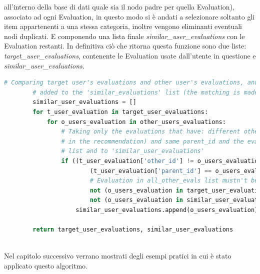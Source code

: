 \begin{itemize}
	all'interno della base di dati quale sia il nodo padre per quella Evaluation), associato ad ogni Evaluation, in questo modo si è andati a selezionare
	soltanto gli item appartenenti a una stessa categoria, inoltre vengono eliminanti eventuali nodi duplicati. E componendo una lista finale 
	\textit{similar\_user\_evaluations} con le Evaluation restanti. 
	In definitiva ciò che ritorna questa funzione sono due liste: \textit{target\_user\_evaluations}, contenente le Evaluation usate dall'utente 
	in questione e \textit{similar\_user\_evaluations}.
	\begin{lstlisting}[language=Python, label=lst:UB_CF_4]
		# Comparing target user's evaluations and other user's evaluations, and if there is a match the evaluation is
		# added to the 'similar_evaluations' list (the matching is made comparing the 'parent_id')
		similar_user_evaluations = []
		for t_user_evaluation in target_user_evaluations:
			for o_users_evaluation in other_users_evaluations:
				# Taking only the evaluations that have: different other_id (excluding the target evaluation
				# in the recommendation) and same parent_id and the evaluations that weren't added to 'target_user_evaluations'
				# list and to 'similar_user_evaluations'
				if ((t_user_evaluation['other_id'] != o_users_evaluation['other_id']) and  # Evaluations must have different 'other_id'
						(t_user_evaluation['parent_id'] == o_users_evaluation['parent_id']) and  # Evaluations must have the same 'parent_id'
						# Evaluation in all_other_evals list mustn't be already added to \
						not (o_users_evaluation in target_user_evaluations) and  # the 'target_user_evaluations' list or
						not (o_users_evaluation in similar_user_evaluations)):  # the 'similar_user_evaluations' list
					similar_user_evaluations.append(o_users_evaluation)
					
    	return target_user_evaluations, similar_user_evaluations
	\end{lstlisting}
\end{itemize}

\ \\
Nel capitolo successivo verrano mostrati degli esempi pratici in cui è stato applicato questo algoritmo.

